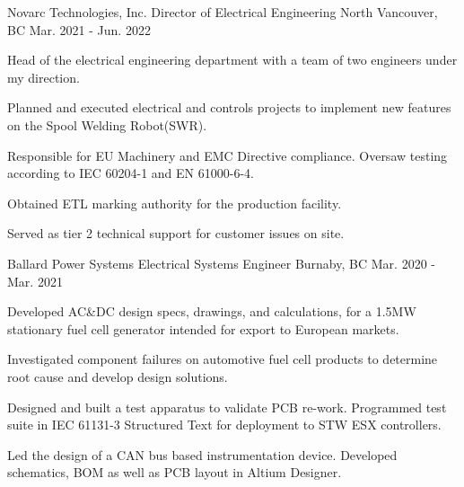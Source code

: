 \begin{cventries}
    \cventry
    {Novarc Technologies, Inc.} %
    {Director of Electrical Engineering} %
    {North Vancouver, BC} %
    {Mar. 2021 - Jun. 2022} %
    { %
        \begin{cvitems}
            \item {Head of the electrical engineering department with a team of two engineers under my direction.}
            \item {Planned and executed electrical and controls projects to implement new features on the Spool Welding Robot(SWR).}
            \item {Responsible for EU Machinery and EMC Directive compliance. Oversaw testing according to IEC 60204-1 and EN 61000-6-4.}
            \item {Obtained ETL marking authority for the production facility.}
            \item {Served as tier 2 technical support for customer issues on site.}
        \end{cvitems}
    }

    \cventry
    {Ballard Power Systems} %
    {Electrical Systems Engineer} %
    {Burnaby, BC} %
    {Mar. 2020 - Mar. 2021} %
    { %
        \begin{cvitems}
            \item {Developed AC\&DC design specs, drawings, and calculations, for a 1.5MW stationary fuel cell generator intended for export to European markets.}
            \item {Investigated component failures on automotive fuel cell products to determine root cause and develop design solutions.}
            \item {Designed and built a test apparatus to validate PCB re-work. Programmed test suite in IEC 61131-3 Structured Text for deployment to STW ESX controllers.}
            \item {Led the design of a CAN bus based instrumentation device. Developed schematics, BOM as well as PCB layout in Altium Designer.}
        \end{cvitems}
    }


\end{cventries}

